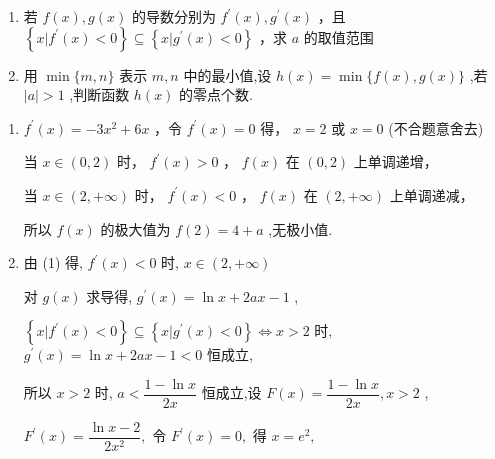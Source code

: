 \begin{enumerate}
\begin{enumerate}
\begin{enumerate}
            \item 若 $f\left( x\right) ,g\left( x\right)$ 的导数分别为 ${f}^{\prime }\left( x\right) ,{g}^{\prime }\left( x\right)$ ，且 $\left\{  {x|{f}^{\prime }\left( x\right)  < 0}\right\}   \subseteq  \left\{  {x|{g}^{\prime }\left( x\right)  < 0}\right\}$ ，求 $a$ 的取值范围
            \item 用 $\min \{ m,n\}$ 表示 $m,n$ 中的最小值,设 $h\left( x\right)  = \min \{ f\left( x\right) ,g\left( x\right) \}$ ,若 $\left| a\right|  > 1$ ,判断函数 $h\left( x\right)$ 的零点个数.
        \end{enumerate}
        \begin{jieda}
            \begin{enumerate}
                \item ${f}^{\prime }\left( x\right)  =  - 3{x}^{2} + {6x}$ ，令 ${f}^{\prime }\left( x\right)  = 0$ 得， $x = 2$ 或 $x = 0$ (不合题意舍去)
                
                当 $x \in  \left( {0,2}\right)$ 时， ${f}^{\prime }\left( x\right)  > 0$ ， $f\left( x\right)$ 在 $\left( {0,2}\right)$ 上单调递增，
                
                当 $x \in  \left( {2, + \infty }\right)$ 时， ${f}^{\prime }\left( x\right)  < 0$ ， $f\left( x\right)$ 在 $\left( {2, + \infty }\right)$ 上单调递减，
                
                所以 $f\left( x\right)$ 的极大值为 $f\left( 2\right)  = 4 + a$ ,无极小值.
                
                \item 由 (1) 得, ${f}^{\prime }\left( x\right)  < 0$ 时, $x \in  \left( {2, + \infty }\right)$
                
                对 $g\left( x\right)$ 求导得, ${g}^{\prime }\left( x\right)  = \ln x + {2ax} - 1$ ,
                
                $\left\{  {x|{f}^{\prime }\left( x\right)  < 0}\right\}   \subseteq  \left\{  {x|{g}^{\prime }\left( x\right)  < 0}\right\}   \Longleftrightarrow  x > 2$ 时, ${g}^{\prime }\left( x\right)  = \ln x + {2ax} - 1 < 0$ 恒成立,
                
                所以 $x > 2$ 时, $a < \dfrac{1 - \ln x}{2x}$ 恒成立,设 $F\left( x\right)  = \dfrac{1 - \ln x}{2x},x > 2$ ,
                
                ${F}^{\prime }\left( x\right)  = \dfrac{\ln x - 2}{2{x}^{2}},$ 令 ${F}^{\prime }\left( x\right)  = 0,$ 得 $x = {{e}}^{2},$
                

\end{enumerate}
\end{jieda}
\end{enumerate}
\end{enumerate}
